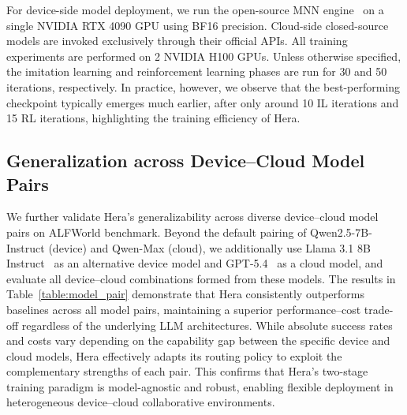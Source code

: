 \documentclass{article}
\newcommand{\needrev}[1]{{\color{darkgreen}#1}} %
\newcommand{\needrev}[1]{#1} %
\newcommand{\name}{Hera\xspace}
\begin{document}
For device-side model deployment, we run the open-source MNN engine~\citep{alibaba2020mnn} on a single NVIDIA RTX 4090 GPU using BF16 precision. Cloud-side closed-source models are invoked exclusively through their official APIs. All training experiments are performed on 2 NVIDIA H100 GPUs. Unless otherwise specified, the imitation learning and reinforcement learning phases are run for 30 and 50 iterations, respectively. In practice, however, we observe that the best-performing checkpoint typically emerges much earlier, after only around 10 IL iterations and 15 RL iterations, highlighting the training efficiency of \name.



\subsection{Generalization across Device--Cloud Model Pairs}
\label{append:model_pair}
We further validate \name’s generalizability across diverse device--cloud model pairs on ALFWorld benchmark.
Beyond the default pairing of Qwen2.5-7B-Instruct (device) and Qwen-Max (cloud), we additionally use Llama 3.1 8B Instruct~\citep{llama31} as an alternative device model and GPT-5.4~\citep{gpt5-4} as a cloud model, and evaluate all device--cloud combinations formed from these models.
The results in Table~\ref{table:model_pair} demonstrate that \name consistently outperforms baselines across all model pairs, maintaining a superior performance--cost trade-off regardless of the underlying LLM architectures. While absolute success rates and costs vary depending on the capability gap between the specific device and cloud models, \name effectively adapts its routing policy to exploit the complementary strengths of each pair. This confirms that \name’s two-stage training paradigm is model-agnostic and robust, enabling flexible deployment in heterogeneous device--cloud collaborative environments.
\end{document}
